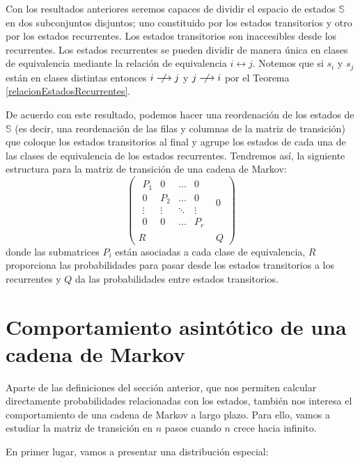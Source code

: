 Con los resultados anteriores seremos capaces de dividir el espacio de estados $\mathbb{S}$ en dos subconjuntos disjuntos; uno constituido por los estados transitorios y otro por los estados recurrentes. Los estados transitorios son inaccesibles desde los recurrentes. Los estados recurrentes se pueden dividir de manera única en clases de equivalencia mediante la relación de equivalencia $i\longleftrightarrow j$. Notemos que si $s_i$ y $s_j$ están en clases distintas entonces $i\centernot\longrightarrow j$ y $j\centernot\longrightarrow i$ por el Teorema \ref{relacionEstadosRecurrentes}.

De acuerdo con este resultado, podemos hacer una reordenación de los estados de $\mathbb{S}$ (es decir, una reordenación de las filas y columnas de la matriz de transición) que coloque los estados transitorios al final y agrupe los estados de cada una de las clases de equivalencia de los estados recurrentes. Tendremos así, la siguiente estructura para la matriz de transición de una cadena de Markov:
\[
\left(
\begin{array}{c|c}
    
    \begin{matrix}
    P_1 & 0 & \dots & 0 \\
    0 & P_2 & \dots & 0 \\
    \vdots & \vdots & \ddots & \vdots \\
    0 & 0 & \dots & P_r
    \end{matrix} & 0 \\
    \hline
     R & Q 
\end{array}
\right)
\]
donde las submatrices $P_i$ están asociadas a cada clase de equivalencia, $R$ proporciona las probabilidades para pasar desde los estados transitorios a los recurrentes y $Q$ da las probabilidades entre estados transitorios.





\section{Comportamiento asintótico de una cadena de Markov}
Aparte de las definiciones del sección anterior, que nos permiten calcular directamente probabilidades relacionadas con los estados, también nos interesa el comportamiento de una cadena de Markov a largo plazo. Para ello, vamos a estudiar la matriz de transición en $n$ pasos cuando $n$ crece hacia infinito.

En primer lugar, vamos a presentar una distribución especial:

